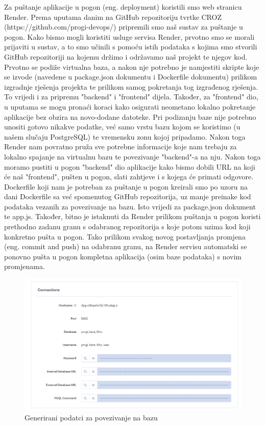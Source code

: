 			Za puštanje aplikacije u pogon (eng. deployment) koristili smo web stranicu Render.
			Prema uputama danim na GitHub repozitoriju tvrtke CROZ (https://github.com/progi-devops/) pripremili smo naš sustav za puštanje u pogon.
			Kako bismo mogli koristiti usluge servisa Render, prvotno smo se morali prijaviti u sustav, a to smo učinili s pomoću istih podataka s kojima smo stvorili GitHub repozitoriji na kojemu držimo i održavamo naš projekt te njegov kod. Prvotno se podiže virtualna baza, a nakon nje potrebno je namjestiti skripte koje se izvode (navedene u package.json dokumentu i Dockerfile dokumentu) prilikom izgradnje rješenja projekta te prilikom samog pokretanja tog izgrađenog rješenja. To vrijedi i za pripremu "backend" i "frontend" dijela. Također, za "frontend" dio, u uputama se mogu pronaći koraci kako osigurati neometano lokalno pokretanje aplikacije bez obzira na novo-dodane datoteke. Pri podizanju baze nije potrebno unositi gotovo nikakve podatke, već samo vrstu bazu kojom se koristimo (u našem slučaju PostgreSQL) te vremensku zonu kojoj pripadamo. Nakon toga Render nam povratno pruža sve potrebne informacije koje nam trebaju za lokalno spajanje na virtualnu bazu te povezivanje "backend"-a na nju. Nakon toga moramo pustiti u pogon "backend" dio aplikacije kako bismo dobili URL na koji će naš "frontend", pušten u pogon, slati zahtjeve i s kojega će primati odgovore. Dockerfile koji nam je potreban za puštanje u pogon kreirali smo po uzoru na dani Dockerfile sa već spomenutog GitHub repozitorija, uz manje preinake kod podataka vezanih za povezivanje na bazu. Isto vrijedi za package.json dokument te app.js. Također, bitno je istaknuti da Render prilikom puštanja u pogon koristi prethodno zadanu granu s odabranog repozitorija s koje potom uzima kod koji konkretno pušta u pogon. Tako prilikom svakog novog postavljanja promjena (eng. commit and push) na odabranu granu, na Render servisu automatski se ponovno pušta u pogon kompletna aplikacija (osim baze podataka) s novim promjenama.
			
			\begin{figure}[H]
				\includegraphics[width=\textwidth]{slike/DB_podatci.png} %
				\caption{Generirani podatci za povezivanje na bazu}
				\label{fig:DB_podatci} %
			\end{figure}
			
